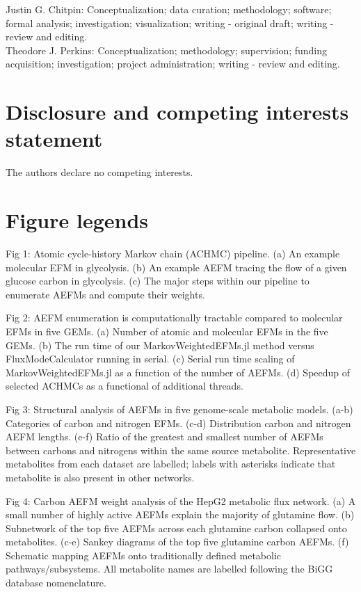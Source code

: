 \documentclass[12pt]{article}
\begin{document}
Justin G. Chitpin: Conceptualization; data curation; methodology;
software; formal analysis; investigation; visualization; writing
- original draft; writing - review and editing.\\

\noindent Theodore J. Perkins: Conceptualization; methodology;
supervision; funding acquisition; investigation; project administration;
writing - review and editing.

\section*{Disclosure and competing interests statement}

The authors declare no competing interests.



\section*{Figure legends}

\noindent Fig 1: Atomic cycle-history Markov chain (ACHMC) pipeline. (a) An
example molecular EFM in glycolysis. (b) An example AEFM tracing the flow
of a given glucose carbon in glycolysis. (c) The major steps within our
pipeline to enumerate AEFMs and compute their weights.

\noindent Fig 2: AEFM enumeration is computationally tractable
compared to molecular EFMs in five GEMs. (a) Number of atomic and
molecular EFMs in the five GEMs. (b) The run time of our
MarkovWeightedEFMs.jl method versus FluxModeCalculator running in serial.
(c) Serial run time scaling of MarkovWeightedEFMs.jl as a function of the
number of AEFMs. (d) Speedup of selected ACHMCs as a functional of
additional threads.

\noindent Fig 3: Structural analysis of AEFMs in five genome-scale
metabolic models. (a-b) Categories of carbon and nitrogen EFMs. (c-d)
Distribution carbon and nitrogen AEFM lengths. (e-f) Ratio of the greatest
and smallest number of AEFMs between carbons and nitrogens within the same
source metabolite. Representative metabolites from each dataset are
labelled; labels with asterisks indicate that metabolite is also present
in other networks.

\noindent Fig 4: Carbon AEFM weight analysis of the HepG2 metabolic
flux network. (a) A small number of highly active AEFMs explain the
majority of glutamine flow. (b) Subnetwork of the top five AEFMs across
each glutamine carbon collapsed onto metabolites. (c-e) Sankey diagrams of
the top five glutamine carbon AEFMs. (f) Schematic mapping AEFMs onto
traditionally defined metabolic pathways/subsystems. All metabolite names are
labelled following the BiGG database nomenclature.
\end{document}

